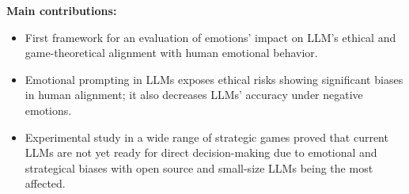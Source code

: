 \documentclass{article}
\begin{document}



\begin{tcolorbox}[colback=gray!20, colframe=gray!50!black, boxrule=0mm, width=\textwidth]
\textbf{Main contributions:} 
\begin{itemize}
    \item First framework for an evaluation of emotions' impact on LLM's ethical and game-theoretical alignment with human emotional behavior.    
    \item Emotional prompting in LLMs exposes ethical risks showing significant biases in human alignment; it also decreases LLMs' accuracy under negative emotions. 
    \item Experimental study in a wide range of strategic games proved that current LLMs are not yet ready for direct decision-making due to emotional and strategical biases with open source and small-size LLMs being the most affected. 
\end{itemize}
\end{tcolorbox}
\end{document}
